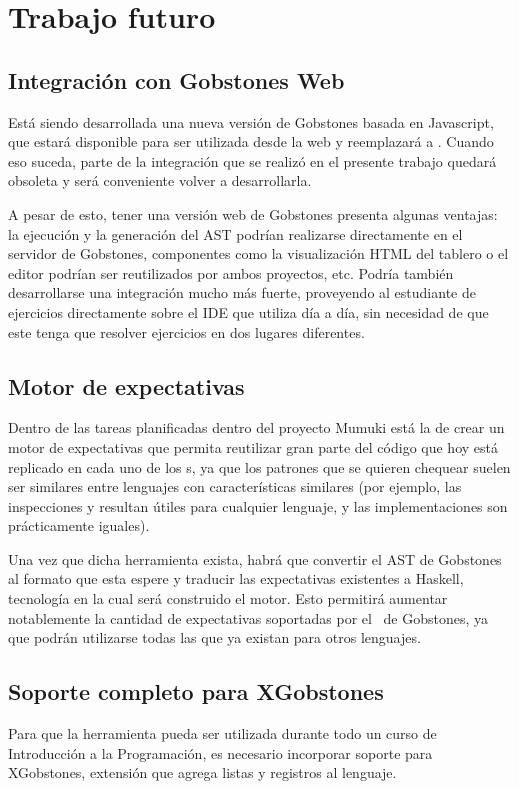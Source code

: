 
\section{Trabajo futuro}

\subsection{Integración con Gobstones Web}
Está siendo desarrollada una nueva versión de Gobstones basada en Javascript, que estará disponible para ser utilizada desde la web y reemplazará a \pyGob. Cuando eso suceda, parte de la integración que se realizó en el presente trabajo quedará obsoleta y será conveniente volver a desarrollarla.

A pesar de esto, tener una versión web de Gobstones presenta algunas ventajas: la ejecución y la generación del AST podrían realizarse directamente en el servidor de Gobstones, componentes como la visualización HTML del tablero o el editor podrían ser reutilizados por ambos proyectos, etc. Podría también desarrollarse una integración mucho más fuerte, proveyendo al estudiante de ejercicios directamente sobre el IDE que utiliza día a día, sin necesidad de que este tenga que resolver ejercicios en dos lugares diferentes.

\subsection{Motor de expectativas}
Dentro de las tareas planificadas dentro del proyecto Mumuki está la de crear un motor de expectativas que permita reutilizar gran parte del código que hoy está replicado en cada uno de los \runner s, ya que los patrones que se quieren chequear suelen ser similares entre lenguajes con características similares (por ejemplo, las inspecciones  y  resultan útiles para cualquier lenguaje, y las implementaciones son prácticamente iguales).

Una vez que dicha herramienta exista, habrá que convertir el AST de Gobstones al formato que esta espere y traducir las expectativas existentes a Haskell, tecnología en la cual será construido el motor. Esto permitirá aumentar notablemente la cantidad de expectativas soportadas por el \runner\ de Gobstones, ya que podrán utilizarse todas las que ya existan para otros lenguajes.

\subsection{Soporte completo para XGobstones}
Para que la herramienta pueda ser utilizada durante todo un curso de Introducción a la Programación, es necesario incorporar soporte para XGobstones, extensión que agrega listas y registros al lenguaje.

